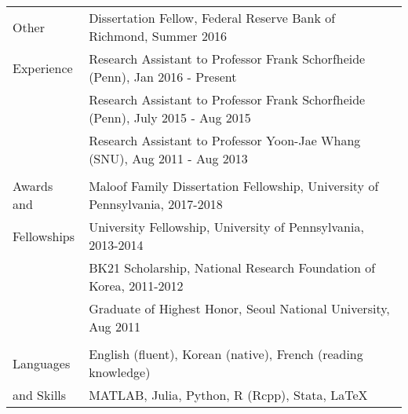 \documentclass[letterpaper,11pt,oneside]{article}
\begin{document}
\begin{tabular}{@{} l l}
       \Large{Other}   & Dissertation Fellow, Federal Reserve Bank of Richmond, Summer 2016\\
     \Large{Experience}  & Research Assistant to Professor Frank Schorfheide (Penn), Jan 2016 - Present \\
     & Research Assistant to Professor Frank Schorfheide (Penn), July 2015 - Aug 2015\\
     & Research Assistant to Professor Yoon-Jae Whang (SNU), Aug 2011 - Aug 2013\\
     \vspace{0.1in} \\
 \Large{Awards and }    & Maloof Family Dissertation Fellowship, University of Pennsylvania, 2017-2018   \\
  \Large{Fellowships}   & University Fellowship, University of Pennsylvania, 2013-2014  \\
     & BK21 Scholarship, National Research Foundation of Korea, 2011-2012\\
     & Graduate of Highest Honor, Seoul National University, Aug 2011 \\
     \vspace{0.1in} \\
  \Large{Languages}   & English (fluent), Korean (native), French (reading knowledge) \\
\Large{and Skills}    & MATLAB, Julia, Python, R (Rcpp), Stata, \LaTeX \\
\end{tabular}
\end{document}
